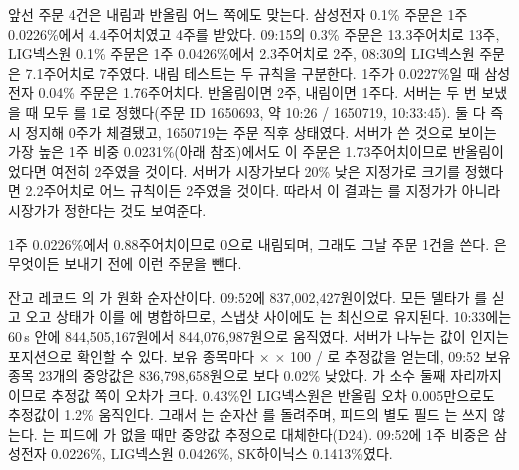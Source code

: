 \seclabel
{}

 앞선 주문 4건은 내림과 반올림 어느 쪽에도 맞는다. 삼성전자 0.1\% 주문은 1주 0.0226\%에서 4.4주어치였고 4주를 받았다. 09:15의 0.3\% 주문은 13.3주어치로 13주, LIG넥스원 0.1\% 주문은 1주 0.0426\%에서 2.3주어치로 2주, 08:30의 LIG넥스원 주문은 7.1주어치로 7주였다. 내림 테스트는 두 규칙을 구분한다. 1주가 0.0227\%일 때 삼성전자 0.04\% 주문은 1.76주어치다. 반올림이면 2주, 내림이면 1주다. 서버는 두 번 보냈을 때 모두 를 1로 정했다(주문 ID 1650693, 약 10:26 / 1650719, 10:33:45). 둘 다 즉시 정지해 0주가 체결됐고, 1650719는 주문 직후  상태였다. 서버가 쓴 것으로 보이는 가장 높은 1주 비중 0.0231\%(아래 참조)에서도 이 주문은 1.73주어치이므로 반올림이었다면 여전히 2주였을 것이다. 서버가 시장가보다 20\% 낮은 지정가로 크기를 정했다면 2.2주어치로 어느 규칙이든 2주였을 것이다. 따라서 이 결과는 를 지정가가 아니라 시장가가 정한다는 것도 보여준다.



 1주 0.0226\%에서 0.88주어치이므로 0으로 내림되며, 그래도 그날 주문 1건을 쓴다. 은 무엇이든 보내기 전에 이런 주문을 뺀다.

 잔고 레코드 의 가 원화 순자산이다. 09:52에 837,002,427원이었다. 모든 델타가 를 싣고 오고 상태가 이를 에 병합하므로, 스냅샷 사이에도 는 최신으로 유지된다. 10:33에는 60\,s 안에 844,505,167원에서 844,076,987원으로 움직였다. 서버가 나누는 값이 인지는 포지션으로 확인할 수 있다. 보유 종목마다  $\times$  $\times$ 100 / 로 추정값을 얻는데, 09:52 보유 종목 23개의 중앙값은 836,798,658원으로 보다 0.02\% 낮았다. 가 소수 둘째 자리까지이므로 추정값 쪽이 오차가 크다. 0.43\%인 LIG넥스원은 반올림 오차 0.005만으로도 추정값이 1.2\% 움직인다. 그래서 는 순자산 를 돌려주며, 피드의 별도 필드 는 쓰지 않는다. 는 피드에 가 없을 때만 중앙값 추정으로 대체한다(D24). 09:52에 1주 비중은 삼성전자 0.0226\%, LIG넥스원 0.0426\%, SK하이닉스 0.1413\%였다.

